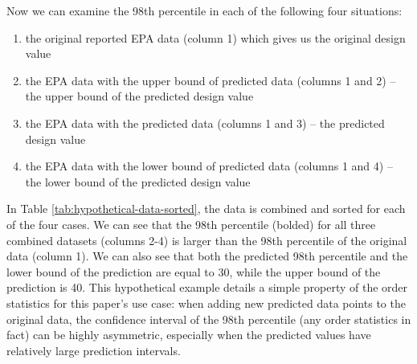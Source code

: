 \documentclass[12pt]{article}
\begin{document}
\begin{table}[h!]
\caption{Hypothetical PM2.5 daily averages from EPA reported measurements and PurpleAir-imputed daily averages that were missing from the EPA data. Column 1: top three original EPA PM2.5 measurements. Columns 2-4: The six added daily averages that were greater than the EPA top 3 daily averages, where added daily averages were filled-in from PurpleAir.}
\label{tab:hypothetical-data}
\end{table}

\FloatBarrier

Now we can examine the 98th percentile in each of the following four situations: 
\begin{enumerate}
    \item the original reported EPA data (column 1) which gives us the original design value
    \item the EPA data with the upper bound of predicted data (columns 1 and 2) -- the upper bound of the predicted design value
    \item the EPA data with the predicted data (columns 1 and 3) -- the predicted design value
    \item the EPA data with the lower bound of predicted data (columns 1 and 4) -- the lower bound of the predicted design value
\end{enumerate}

In Table \ref{tab:hypothetical-data-sorted}, the data is combined and sorted for each of the four cases. We can see that the 98th percentile (bolded) for all three combined datasets (columns 2-4) is larger than the 98th percentile of the original data (column 1). We can also see that both the predicted 98th percentile and the lower bound of the prediction are equal to 30, while the upper bound of the prediction is 40. This hypothetical example details a simple property of the order statistics for this paper's use case: when adding new predicted data points to the original data, the confidence interval of the 98th percentile (any order statistics in fact) can be highly asymmetric, especially when the predicted values have relatively large prediction intervals.
\end{document}
